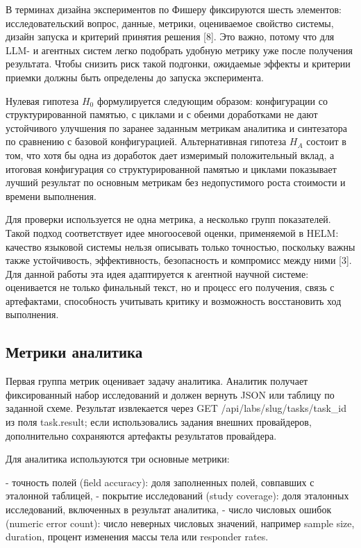 В терминах дизайна экспериментов по Фишеру фиксируются шесть элементов: исследовательский вопрос, данные, метрики, оцениваемое свойство системы, дизайн запуска и критерий принятия решения [8]. Это важно, потому что для LLM- и агентных систем легко подобрать удобную метрику уже после получения результата. Чтобы снизить риск такой подгонки, ожидаемые эффекты и критерии приемки должны быть определены до запуска эксперимента.

Нулевая гипотеза $H_0$ формулируется следующим образом: конфигурации со структурированной памятью, с циклами и с обеими доработками не дают устойчивого улучшения по заранее заданным метрикам аналитика и синтезатора по сравнению с базовой конфигурацией. Альтернативная гипотеза $H_A$ состоит в том, что хотя бы одна из доработок дает измеримый положительный вклад, а итоговая конфигурация со структурированной памятью и циклами показывает лучший результат по основным метрикам без недопустимого роста стоимости и времени выполнения.

Для проверки используется не одна метрика, а несколько групп показателей. Такой подход соответствует идее многоосевой оценки, применяемой в HELM: качество языковой системы нельзя описывать только точностью, поскольку важны также устойчивость, эффективность, безопасность и компромисс между ними [3]. Для данной работы эта идея адаптируется к агентной научной системе: оценивается не только финальный текст, но и процесс его получения, связь с артефактами, способность учитывать критику и возможность восстановить ход выполнения.

\subsection{Метрики аналитика}

Первая группа метрик оценивает задачу аналитика. Аналитик получает фиксированный набор исследований и должен вернуть JSON или таблицу по заданной схеме. Результат извлекается через GET /api/labs/{slug}/tasks/{task_id} из поля task.result; если использовались задания внешних провайдеров, дополнительно сохраняются артефакты результатов провайдера.

Для аналитика используются три основные метрики:

- точность полей (field accuracy): доля заполненных полей, совпавших с эталонной таблицей,
- покрытие исследований (study coverage): доля эталонных исследований, включенных в результат аналитика,
- число числовых ошибок (numeric error count): число неверных числовых значений, например sample size, duration, процент изменения массы тела или responder rates.

